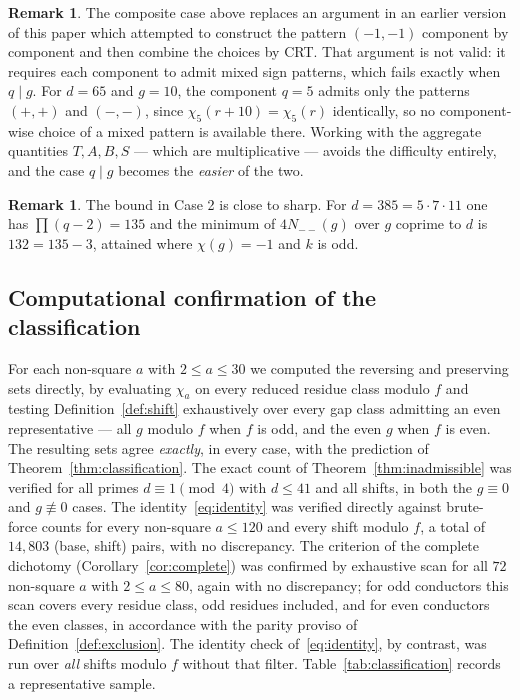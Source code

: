 \documentclass[11pt,reqno]{amsart}
\theoremstyle{plain}
\theoremstyle{definition}
\newtheorem{remark}[theorem]{Remark}
\begin{document}
\begin{remark}
\label{rem:oldproof}
The composite case above replaces an argument in an earlier version of this
paper which attempted to construct the pattern $(-1,-1)$ component by
component and then combine the choices by CRT. That argument is not valid: it
requires each component to admit mixed sign patterns, which fails exactly when
$q \mid g$. For $d = 65$ and $g = 10$, the component $q = 5$ admits only the
patterns $(+,+)$ and $(-,-)$, since $\chi_5(r+10) = \chi_5(r)$ identically, so
no component-wise choice of a mixed pattern is available there. Working with
the aggregate quantities $T, A, B, S$ --- which are multiplicative --- avoids
the difficulty entirely, and the case $q \mid g$ becomes the \emph{easier} of
the two.
\end{remark}

\begin{remark}
The bound in Case 2 is close to sharp. For $d = 385 = 5 \cdot 7 \cdot 11$ one
has $\prod (q-2) = 135$ and the minimum of $4N_{--}(g)$ over $g$ coprime to
$d$ is $132 = 135 - 3$, attained where $\chi(g) = -1$ and $k$ is odd.
\end{remark}

\subsection*{Computational confirmation of the classification}
For each non-square $a$ with $2 \le a \le 30$ we computed the reversing and
preserving sets directly, by evaluating $\chi_a$ on every reduced residue
class modulo $f$ and testing Definition~\ref{def:shift} exhaustively over
every gap class admitting an even representative --- all $g$ modulo $f$ when
$f$ is odd, and the even $g$ when $f$ is even. The resulting sets agree \emph{exactly}, in every case,
with the prediction of Theorem~\ref{thm:classification}. The exact count of
Theorem~\ref{thm:inadmissible} was verified for all primes
$d \equiv 1 \pmod 4$ with $d \le 41$ and all shifts, in both the $g \equiv 0$
and $g \not\equiv 0$ cases. The identity~\eqref{eq:identity} was verified
directly against brute-force counts for every non-square $a \le 120$ and every
shift modulo $f$, a total of $14{,}803$ (base, shift) pairs, with no
discrepancy. The criterion of the complete dichotomy
(Corollary~\ref{cor:complete}) was confirmed by exhaustive scan for all $72$
non-square $a$ with $2 \le a \le 80$, again with no discrepancy; for odd
conductors this scan covers every residue class, odd residues included, and
for even conductors the even classes, in accordance with the parity proviso of
Definition~\ref{def:exclusion}. The identity check of~\eqref{eq:identity}, by
contrast, was run over \emph{all} shifts modulo $f$ without that filter.
Table~\ref{tab:classification} records a representative sample.
\end{document}
